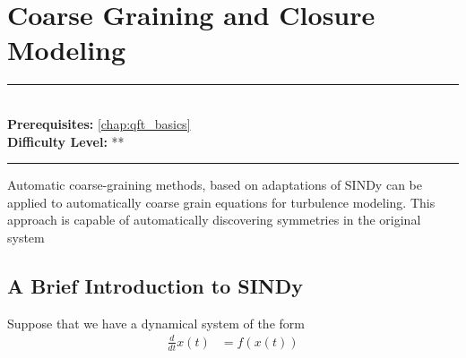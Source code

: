 \documentclass[book.tex]{subfiles}
\begin{document}
\chapter{Coarse Graining and Closure Modeling}

\label{chap:coarse_graining_closure}
\noindent\rule{11cm}{0.4pt} \\
\textbf{Prerequisites:} \autoref{chap:qft_basics}  \\
\textbf{Difficulty Level:} ** \\
\noindent\rule{11cm}{0.4pt}
\vspace{5mm}

Automatic coarse-graining methods, based on adaptations of SINDy can be applied to automatically coarse grain equations for turbulence modeling. This approach is capable of automatically discovering symmetries in the original system \cite{bakarji2021data}

\section{A Brief Introduction to SINDy}

Suppose that we have a dynamical system of the form
\begin{align}
    \frac{d}{dt} x(t) &= f(x(t))
\end{align}
\end{document}
